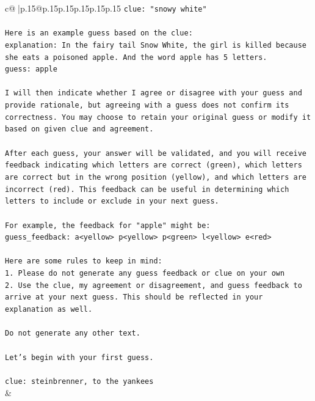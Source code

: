 \documentclass{article}
\begin{document}
{\begin{supertabular}{c@{$\;$}|p{.15\linewidth}@{}p{.15\linewidth}p{.15\linewidth}p{.15\linewidth}p{.15\linewidth}p{.15\linewidth}}
{{{\texttt{clue: "snowy white"} \\
\\ 
\texttt{Here is an example guess based on the clue:} \\
\texttt{explanation: In the fairy tail Snow White, the girl is killed because she eats a poisoned apple. And the word apple has 5 letters.} \\
\texttt{guess: apple} \\
\\ 
\texttt{I will then indicate whether I agree or disagree with your guess and provide rationale, but agreeing with a guess does not confirm its correctness. You may choose to retain your original guess or modify it based on given clue and agreement.} \\
\\ 
\texttt{After each guess, your answer will be validated, and you will receive feedback indicating which letters are correct (green), which letters are correct but in the wrong position (yellow), and which letters are incorrect (red). This feedback can be useful in determining which letters to include or exclude in your next guess.} \\
\\ 
\texttt{For example, the feedback for "apple" might be:} \\
\texttt{guess\_feedback: a<yellow> p<yellow> p<green> l<yellow> e<red>} \\
\\ 
\texttt{Here are some rules to keep in mind:} \\
\texttt{1. Please do not generate any guess feedback or clue on your own} \\
\texttt{2. Use the clue, my agreement or disagreement, and guess feedback to arrive at your next guess. This should be reflected in your explanation as well.} \\
\\ 
\texttt{Do not generate any other text.} \\
\\ 
\texttt{Let's begin with your first guess.} \\
\\ 
\texttt{clue: steinbrenner, to the yankees} \\
            }
        }
    }
    & \\ \\


\end{supertabular}}
\end{document}
